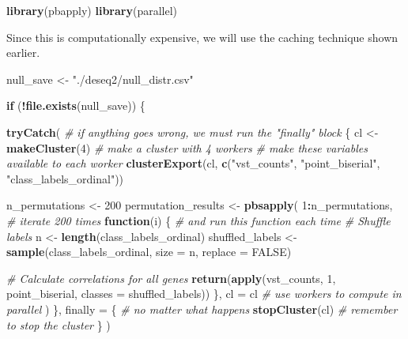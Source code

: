 \documentclass[
]{book}
\newenvironment{Shaded}{\begin{snugshade}}{\end{snugshade}}
\newcommand{\AttributeTok}[1]{\textcolor[rgb]{0.13,0.29,0.53}{#1}}
\newcommand{\CommentTok}[1]{\textcolor[rgb]{0.56,0.35,0.01}{\textit{#1}}}
\newcommand{\ConstantTok}[1]{\textcolor[rgb]{0.56,0.35,0.01}{#1}}
\newcommand{\ControlFlowTok}[1]{\textcolor[rgb]{0.13,0.29,0.53}{\textbf{#1}}}
\newcommand{\DecValTok}[1]{\textcolor[rgb]{0.00,0.00,0.81}{#1}}
\newcommand{\FunctionTok}[1]{\textcolor[rgb]{0.13,0.29,0.53}{\textbf{#1}}}
\newcommand{\NormalTok}[1]{#1}
\newcommand{\OtherTok}[1]{\textcolor[rgb]{0.56,0.35,0.01}{#1}}
\newcommand{\SpecialCharTok}[1]{\textcolor[rgb]{0.81,0.36,0.00}{\textbf{#1}}}
\newcommand{\StringTok}[1]{\textcolor[rgb]{0.31,0.60,0.02}{#1}}
\begin{document}
\begin{Shaded}
\begin{Highlighting}[numbers=left,,]
\FunctionTok{library}\NormalTok{(pbapply)}
\FunctionTok{library}\NormalTok{(parallel)}
\end{Highlighting}
\end{Shaded}

Since this is computationally expensive, we will use the caching technique shown earlier.

\begin{Shaded}
\begin{Highlighting}[numbers=left,,]
\NormalTok{null\_save }\OtherTok{\textless{}{-}} \StringTok{"./deseq2/null\_distr.csv"}

\ControlFlowTok{if}\NormalTok{ (}\SpecialCharTok{!}\FunctionTok{file.exists}\NormalTok{(null\_save)) \{}

  \FunctionTok{tryCatch}\NormalTok{(             }\CommentTok{\# if anything goes wrong, we must run the "finally" block}
\NormalTok{    \{}
\NormalTok{      cl }\OtherTok{\textless{}{-}} \FunctionTok{makeCluster}\NormalTok{(}\DecValTok{4}\NormalTok{) }\CommentTok{\# make a cluster with 4 workers}
      \CommentTok{\# make these variables available to each worker}
      \FunctionTok{clusterExport}\NormalTok{(cl, }\FunctionTok{c}\NormalTok{(}\StringTok{"vst\_counts"}\NormalTok{, }\StringTok{"point\_biserial"}\NormalTok{, }\StringTok{"class\_labels\_ordinal"}\NormalTok{))}

\NormalTok{      n\_permutations }\OtherTok{\textless{}{-}} \DecValTok{200}
\NormalTok{      permutation\_results }\OtherTok{\textless{}{-}} \FunctionTok{pbsapply}\NormalTok{(}
        \DecValTok{1}\SpecialCharTok{:}\NormalTok{n\_permutations,   }\CommentTok{\# iterate 200 times}
        \ControlFlowTok{function}\NormalTok{(i) \{       }\CommentTok{\# and run this function each time}
          \CommentTok{\# Shuffle labels}
\NormalTok{          n }\OtherTok{\textless{}{-}} \FunctionTok{length}\NormalTok{(class\_labels\_ordinal)}
\NormalTok{          shuffled\_labels }\OtherTok{\textless{}{-}} \FunctionTok{sample}\NormalTok{(class\_labels\_ordinal, }\AttributeTok{size =}\NormalTok{ n, }\AttributeTok{replace =} \ConstantTok{FALSE}\NormalTok{)}

          \CommentTok{\# Calculate correlations for all genes}
          \FunctionTok{return}\NormalTok{(}\FunctionTok{apply}\NormalTok{(vst\_counts, }\DecValTok{1}\NormalTok{, point\_biserial, }\AttributeTok{classes =}\NormalTok{ shuffled\_labels))}
\NormalTok{        \},}
        \AttributeTok{cl =}\NormalTok{ cl }\CommentTok{\# use workers to compute in parallel}
\NormalTok{      )}
\NormalTok{    \},}
    \AttributeTok{finally =}\NormalTok{ \{         }\CommentTok{\# no matter what happens}
      \FunctionTok{stopCluster}\NormalTok{(cl)   }\CommentTok{\# remember to stop the cluster}
\NormalTok{    \}}
\NormalTok{  )}


\end{Highlighting}
\end{Shaded}
\end{document}
